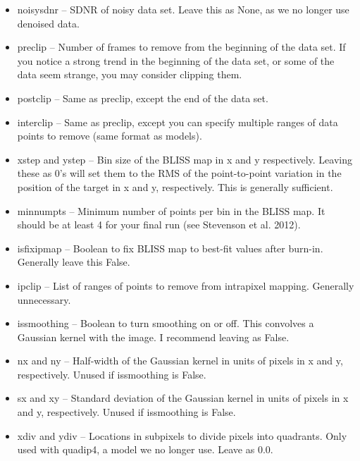 \documentclass[letterpaper,12pt]{article}
\begin{document}
\begin{itemize}
\item noisysdnr -- SDNR of noisy data set. Leave this as None, as we no longer
  use denoised data.

\item preclip -- Number of frames to remove from the beginning of the
  data set. If you notice a strong trend in the beginning of the data
  set, or some of the data seem strange, you may consider clipping
  them.

\item postclip -- Same as preclip, except the end of the data set.

\item interclip -- Same as preclip, except you can specify multiple
  ranges of data points to remove (same format as models).

\item xstep and ystep -- Bin size of the BLISS map in x and y
  respectively. Leaving these as 0's will set them to the RMS of
  the point-to-point variation in the position of the target in x
  and y, respectively. This is generally sufficient.

\item minnumpts -- Minimum number of points per bin in the BLISS
  map. It should be at least 4 for your final run (see Stevenson et
  al. 2012).

\item isfixipmap -- Boolean to fix BLISS map to best-fit values after
  burn-in. Generally leave this False.

\item ipclip -- List of ranges of points to remove from intrapixel
  mapping. Generally unnecessary.

\item issmoothing -- Boolean to turn smoothing on or off. This
  convolves a Gaussian kernel with the image. I recommend leaving as
  False.

\item nx and ny -- Half-width of the Gaussian kernel in units of pixels
  in x and y, respectively. Unused if issmoothing is False.

\item sx and xy -- Standard deviation of the Gaussian kernel in units
  of pixels in x and y, respectively. Unused if issmoothing is False.

\item xdiv and ydiv -- Locations in subpixels to divide pixels into
  quadrants.  Only used with quadip4, a model we no longer use. Leave
  as 0.0.

\end{itemize}
\end{document}
